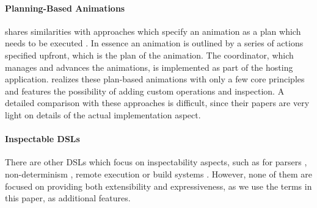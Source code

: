 \paragraph{Planning-Based Animations}

\dsl{} shares similarities with approaches which specify an animation as a plan which needs to be executed \cite{DBLP:conf/chi/KurlanderL95,DBLP:conf/eics/MirlacherPB12}. In essence an animation is outlined by a series of actions specified upfront, which is the plan of the animation. The coordinator, which manages and advances the animations, is implemented as part of the hosting application. \dsl{} realizes these plan-based animations with only a few core principles and features the possibility of adding custom operations and inspection. A detailed comparison with these approaches is difficult, since their papers are very light on details of the actual implementation aspect.

\paragraph{Inspectable DSLs}

There are other DSLs which focus on inspectability aspects, such as for parsers \cite{DBLP:journals/scp/Hughes00,DBLP:journals/corr/CapriottiK14,DBLP:conf/icfp/Lindley14}, non-determinism \cite{DBLP:journals/corr/abs-1905-06544}, remote execution \cite{DBLP:conf/haskell/Gibbons16,DBLP:conf/haskell/GillSDEFGRSS15} or build systems \cite{DBLP:journals/pacmpl/MokhovMJ18}. However, none of them are focused on providing both extensibility and expressiveness, as we use the terms in this paper, as additional features.

